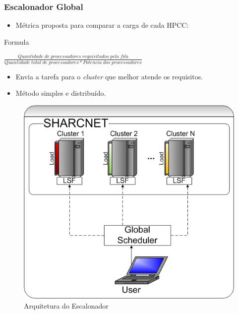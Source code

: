 \documentclass[red, cover=invisible, theme=Warsaw]{myslides}
\begin{document}
	\begin{frame} \frametitle{Escalonador Global}
	    \begin{itemize}
		\item Métrica proposta para comparar a carga de cada HPCC:
	    \end{itemize}
	    \begin{block}{Formula}
		\begin{center}
		$\frac{Quantidade\; de\; processadores\; requisitados\; pela\; fila}{Quantidade\; total\; de\;  processadores * Potencia\; dos\; processadores}$
		\end{center}
	    \end{block}
	    \begin{itemize}		
		\item Envia a tarefa para o \textit{cluster} que melhor atende os requisitos.
		\item Método simples e distribuído.
	    \end{itemize}
	    \begin{center}
		\begin{figure}
		\includegraphics[scale=0.15]{imagens/scheduler.png}
		\caption{Arquitetura do Escalonador}
		\end{figure}
	    \end{center}
	\end{frame}
	
\end{document}
